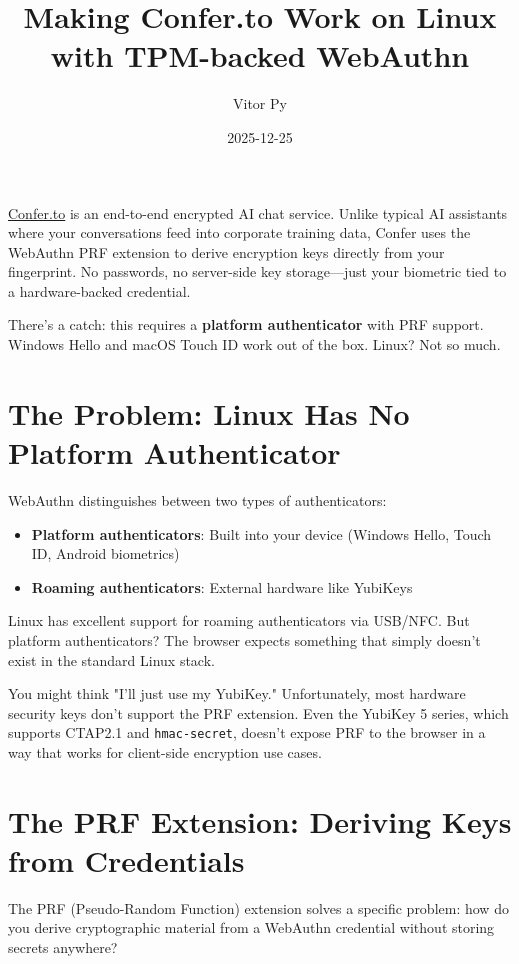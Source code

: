 \documentclass{article}
\title{Making Confer.to Work on Linux with TPM-backed WebAuthn}
\author{Vitor Py}
\date{2025-12-25}
\begin{document}

\maketitle

\href{https://confer.to}{Confer.to} is an end-to-end encrypted AI chat service. Unlike typical AI assistants where your conversations feed into corporate training data, Confer uses the WebAuthn PRF extension to derive encryption keys directly from your fingerprint. No passwords, no server-side key storage---just your biometric tied to a hardware-backed credential.

There's a catch: this requires a \textbf{platform authenticator} with PRF support. Windows Hello and macOS Touch ID work out of the box. Linux? Not so much.

\section{The Problem: Linux Has No Platform Authenticator}

WebAuthn distinguishes between two types of authenticators:

\begin{itemize}
\item \textbf{Platform authenticators}: Built into your device (Windows Hello, Touch ID, Android biometrics)

\item \textbf{Roaming authenticators}: External hardware like YubiKeys

\end{itemize}

Linux has excellent support for roaming authenticators via USB/NFC. But platform authenticators? The browser expects something that simply doesn't exist in the standard Linux stack.

You might think "I'll just use my YubiKey." Unfortunately, most hardware security keys don't support the PRF extension. Even the YubiKey 5 series, which supports CTAP2.1 and \texttt{hmac-secret}, doesn't expose PRF to the browser in a way that works for client-side encryption use cases.

\section{The PRF Extension: Deriving Keys from Credentials}

The PRF (Pseudo-Random Function) extension solves a specific problem: how do you derive cryptographic material from a WebAuthn credential without storing secrets anywhere?
\end{document}
